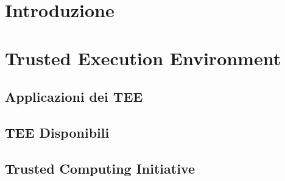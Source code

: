\documentclass[12pt,italian]{report}
\begin{document}
\frontespizio
\afterpreface

\chapter{Introduzione}
\label{cap:introduzione}

\chapter{Trusted Execution Environment}
\label{sec:tee}


\section{Applicazioni dei TEE}
\label{sec:applicazioni-tee}

\section{TEE Disponibili}
\label{sec:tee-disponibili}

\section{Trusted Computing Initiative}
\label{sec:trusted-computing-initiative}
\end{document}
